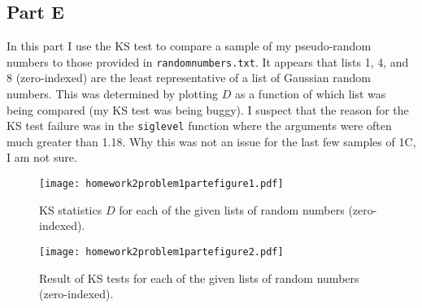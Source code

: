 \subsection{Part E}

In this part I use the KS test to compare a sample of my pseudo-random numbers to those provided in \texttt{randomnumbers.txt}. It appears that lists 1, 4, and 8 (zero-indexed) are the least representative of a list of Gaussian random numbers. This was determined by plotting $D$ as a function of which list was being compared (my KS test was being buggy). I suspect that the reason for the KS test failure was in the \texttt{siglevel} function where the arguments were often much greater than 1.18. Why this was not an issue for the last few samples of 1C, I am not sure.



\clearpage

\begin{figure}[h]
    \centering
    \texttt{[image: homework2problem1partefigure1.pdf]}
    \caption{KS statistics $D$ for each of the given lists of random numbers (zero-indexed).}
    \label{fig:21e1}
\end{figure}

\begin{figure}[h]
    \centering
    \texttt{[image: homework2problem1partefigure2.pdf]}
    \caption{Result of KS tests for each of the given lists of random numbers (zero-indexed).}
    \label{fig:21e2}
\end{figure}

\clearpage
